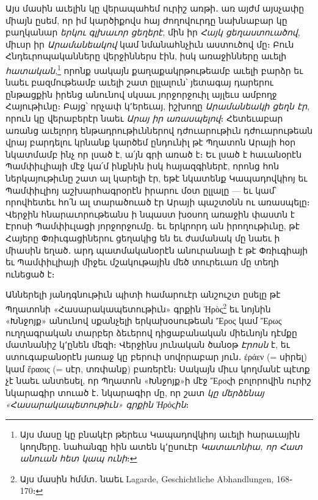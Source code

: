 \documentclass{article}
\begin{document}
{Այս մասին աւելին կը վերապահեմ ուրիշ առթի․ առ այժմ այսչափը միայն ըսեմ, որ իմ կարծիքովս հայ ժողովուրդը նախնաբար կը բաղկանար \emph{երկու գլխաւոր ցեղերէ}, մին իր \emph{Հայկ ցեղաստուածով}, միւսր իր \emph{Արամանեակով} կամ նմանահնչիւն աստուծով մը։ Բուն Հնդեւրոպականները վերջիններս էին, իսկ առաջինները աւելի \emph{հատական},\footnote{Այս մասը կը բնակէր թերեւս Կապադովկիոյ աւելի հարաւային կողմերը․ նահանգը հին ատեն կ՚ըսուէր \emph{Կատաւոնիա, որ Հատ անուան հետ կապ ունի}։} որոնք սակայն քաղաքակրթութեամբ աւելի բարձր եւ նաեւ բազմութեամբ աւելի շատ ըլլալուն՝ յետագայ դարերու ընթացքին իրենց անունով սկսաւ յորջորջուիլ այլեւս ամբողջ Հայութիւնը։ Բայց՝ որչափ կ՚երեւայ, իշխողը \emph{Արամանեակի ցեղն էր}, որուն կը վերաբերէր նաեւ \emph{Արայ իր առասպելով}։ Հետեւաբար առանց աւելորդ ենթադրութիւններով դժուարութիւն դժուարութեան վրայ բարդելու կրնանք կարծեմ ընդունիլ թէ Պղատոն Արայի հօր նկատմամբ ինչ որ լսած է, ա՛յն գրի առած է։ Եւ լսած է հաւանօրէն Պամփիւլիայի մէջ կա՛մ ինքնին իսկ հայազգիներէ, որոնց հոն ներկայութիւնը շատ ալ կարելի էր, եթէ նկատենք Կապադովկիոյ եւ Պամփիւլիոյ աշխարհագրօրէն իրարու մօտ ըլլալը — եւ կամ՝ որովհետեւ հո՛ն ալ տարածուած էր Արայի պաշտօնն ու առասպելը։ Վերջին հնարաւորութեանս ի նպաստ խօսող առաջին փաստն է Էրոսի Պամփիւլացի յորջորջումը․ եւ երկրորդ ան իրողութիւնը, թէ Հայերը Փռիւգացիներու ցեղակից են եւ ժամանակ մը նաեւ ի միասին եղած․ արդ պատմականօրէն անուրանալի է թէ Փռիւգիայի եւ Պամփիւլիայի միջեւ մշակութային մեծ տուրեւառ մը տեղի ունեցած է։

Աններելի յանդգնութիւն պիտի համարուէր անշուշտ ըսելը թէ Պղատոնի «Հասարակապետութիւն» գրքին Ἠρὸς\footnote{Այս մասին հմմտ․ նաեւ Lagarde, Geschichtliche Abhandlungen, 168֊170։} եւ նոյնին «Խնջոյք» անունով սքանչելի երկախօսութեան Ἔρος կամ Ἔρως ուղղագրական տարբեր ձեւերով դիցաբանական միեւնոյն դէմքը մատնանիշ կ՚ընեն մեզի։ Վերջինս յունական ծանօթ \emph{Էրոսն} է, եւ ստուգաբանօրէն յառաջ կը բերուի սովորաբար յուն․ ἐράεν (= սիրել) կամ ἔραοις (= սէր, տռփանք) բառերէն։ Սակայն միւս կողմանէ պէտք չէ նաեւ անտեսել, որ Պղատոն «Խնջոյք»ի մէջ Ἔροςի բոլորովին ուրիշ նկարագիր տուած է․ նկարագիր մը, որ շատ \emph{կը մերձենայ «Հասարակապետութիւն» գրքին Ἠρὸςին}։

}
\end{document}
